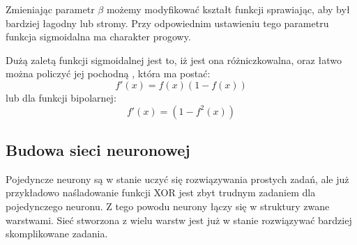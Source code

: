 \documentclass[a4paper,12pt]{article}
\numberwithin{equation}{section}
\begin{document}
Zmieniając parametr $\beta$ możemy modyfikować kształt funkcji sprawiając, aby był bardziej łagodny lub stromy. Przy odpowiednim ustawieniu tego parametru funkcja sigmoidalna ma charakter progowy.

Dużą zaletą funkcji sigmoidalnej jest to, iż jest ona różniczkowalna, oraz łatwo można policzyć jej pochodną \cite{sigmoid_derivative}, która ma postać:
\begin{equation}
    f'(x)=f(x)(1-f(x))
\end{equation}
lub dla funkcji bipolarnej:
\begin{equation}
    f'(x)=(1-f^2(x))
\end{equation}


\subsection{Budowa sieci neuronowej}

Pojedyncze neurony są w stanie uczyć się rozwiązywania prostych zadań, ale już przykładowo naśladowanie funkcji XOR jest zbyt trudnym zadaniem dla pojedynczego neuronu. Z tego powodu neurony łączy się w struktury zwane warstwami. Sieć stworzona z wielu warstw jest już w stanie rozwiązywać bardziej skomplikowane zadania.
\end{document}
